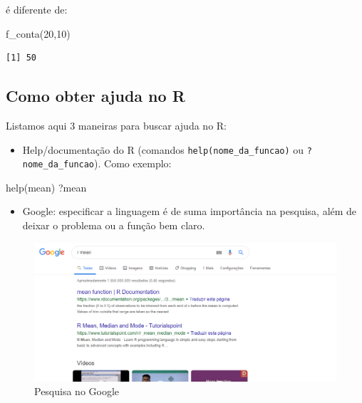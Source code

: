 \documentclass[
  letterpaper,
  DIV=11,
  numbers=noendperiod]{scrreprt}
\newenvironment{Shaded}{\begin{snugshade}}{\end{snugshade}}
\newcommand{\DecValTok}[1]{\textcolor[rgb]{0.68,0.00,0.00}{#1}}
\newcommand{\FunctionTok}[1]{\textcolor[rgb]{0.28,0.35,0.67}{#1}}
\newcommand{\NormalTok}[1]{\textcolor[rgb]{0.00,0.23,0.31}{#1}}
\providecommand{\tightlist}{%
  \setlength{\itemsep}{0pt}\setlength{\parskip}{0pt}}\usepackage{longtable,booktabs,array}
\begin{document}
é diferente de:

\begin{Shaded}
\begin{Highlighting}[]
\FunctionTok{f\_conta}\NormalTok{(}\DecValTok{20}\NormalTok{,}\DecValTok{10}\NormalTok{)}
\end{Highlighting}
\end{Shaded}

\begin{verbatim}
[1] 50
\end{verbatim}

\hypertarget{como-obter-ajuda-no-r}{%
\subsection{Como obter ajuda no R}\label{como-obter-ajuda-no-r}}

Listamos aqui 3 maneiras para buscar ajuda no R:

\begin{itemize}
\tightlist
\item
  Help/documentação do R (comandos \texttt{help(nome\_da\_funcao)} ou
  \texttt{?nome\_da\_funcao}). Como exemplo:
\end{itemize}

\begin{Shaded}
\begin{Highlighting}[]
\FunctionTok{help}\NormalTok{(mean) }
\NormalTok{?mean}
\end{Highlighting}
\end{Shaded}

\begin{itemize}
\tightlist
\item
  Google: especificar a linguagem é de suma importância na pesquisa,
  além de deixar o problema ou a função bem claro.
\end{itemize}

\begin{figure}

{\centering \includegraphics[width=1\textwidth,height=\textheight]{./figuras_tutorialR/help_R.png}

}

\caption{\label{fig:help}Pesquisa no Google}

\end{figure}
\end{document}
